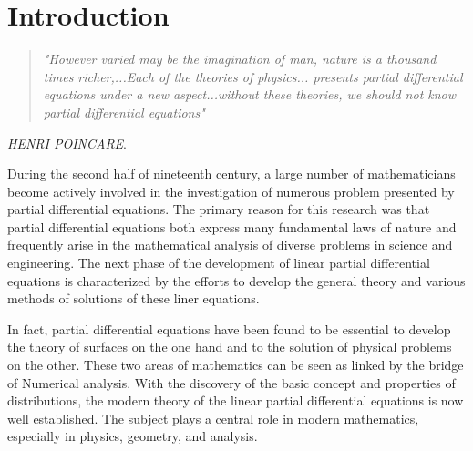\pagestyle{fancy}
\renewcommand{\sectionmark}[1]{\markright{#1}}
\rhead{\tiny\itshape\leftmark{}}
\chead{}
\cfoot{\medskip\sffamily\large\thepage }
\renewcommand{\headrulewidth}{0.01pt}
\renewcommand{\footrulewidth}{0.01pt}
\chapter{Introduction} %

\begin{quote}
{\em "However varied may be the imagination of man, nature is a thousand times richer,...Each of the theories of physics...
presents partial differential equations under a new aspect...without these theories, we should not know partial differential equations" }
\end{quote}
 \hfill{{\em HENRI POINCARE}.}

\medskip

During the second half of nineteenth century, a large number of mathematicians become actively involved
in the investigation of numerous problem presented by partial differential equations.
The primary reason for this research was that partial differential equations both
express many fundamental laws of nature and frequently arise in the mathematical
analysis of diverse problems in science and engineering. The next phase of the
development of linear partial differential equations is characterized by the efforts
to develop the general theory and various methods of solutions of these liner equations.\

In fact, partial differential equations have been found to be essential to develop the
theory of surfaces on the one hand and to the solution of physical problems on the other.
These two areas of mathematics can be seen as linked by the bridge of Numerical analysis.
With the discovery of the basic concept and properties of distributions, the modern theory
of the linear partial differential equations is now well established. The subject plays a
central role in modern mathematics, especially in physics, geometry, and analysis.\


